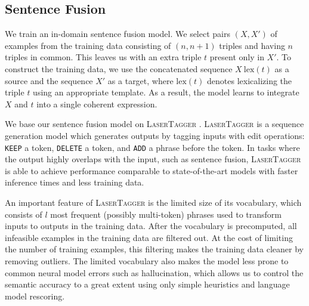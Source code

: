 \subsection{Sentence Fusion}
We train an in-domain sentence fusion model.
We select pairs $(X, X')$ of examples from the training data consisting of $(n, n+1)$ triples and having $n$ triples in common. This leaves us with an extra triple $t$ present only in $X'$. To construct the training data, we use the concatenated sequence $X~\mathrm{lex}(t)$ as a source and the sequence $X'$ as a target, where $\mathrm{lex}(t)$ denotes lexicalizing the triple $t$ using an appropriate template. %
As a result, the model learns to integrate $X$ and $t$ into a single coherent expression.

We base our sentence fusion model on \textsc{LaserTagger} \citep{malmi2019encode}. \textsc{LaserTagger}
is a sequence generation model which generates outputs by tagging inputs with edit operations: \texttt{KEEP} a token, \texttt{DELETE} a token, and \texttt{ADD} a phrase before the token. In tasks where the output highly overlaps with the input, such as sentence fusion, \textsc{LaserTagger} is able to achieve performance comparable to state-of-the-art models with faster inference times and less training data.

An important feature of \textsc{LaserTagger} is the limited size of its vocabulary, which consists of $l$ most frequent (possibly multi-token) phrases used to transform inputs to outputs in the training data. After the vocabulary is precomputed, all infeasible examples in the training data are filtered out. At the cost of limiting the number of training examples, this filtering makes the training data cleaner by removing outliers. The limited vocabulary also makes the model less prone to common neural model errors such as hallucination, which allows us to control the semantic accuracy to a great extent using only simple heuristics and language model rescoring.

